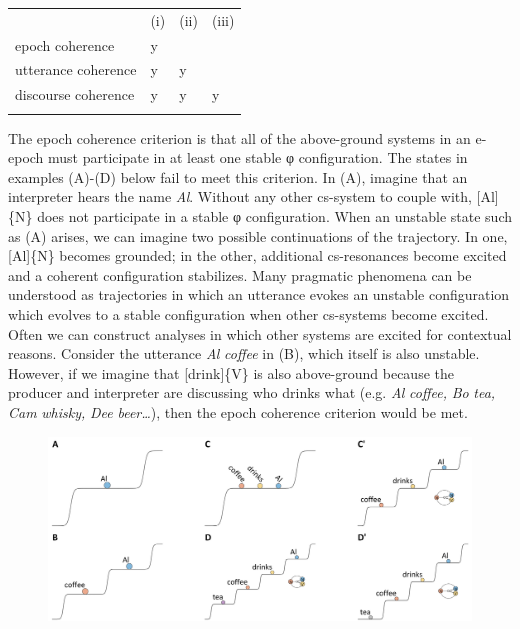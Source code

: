 \begin{tabularx}{\textwidth}{XXXX} & (i) & (ii) & (iii)\\
\lsptoprule
\raggedleft epoch coherence & y &  & \\
\raggedleft utterance coherence & y & y & \\
\raggedleft discourse coherence & y & y & y\\
\lspbottomrule
\end{tabularx}
  The epoch coherence criterion is that all of the above-ground systems in an e-epoch must participate in at least one stable φ configuration. The states in examples (A)-(D) below fail to meet this criterion. In (A), imagine that an interpreter hears the name \textit{Al}. Without any other cs-system to couple with, [Al]\{N\} does not participate in a stable φ configuration. When an unstable state such as (A) arises, we can imagine two possible continuations of the trajectory. In one, [Al]\{N\} becomes grounded; in the other, additional cs-resonances become excited and a coherent configuration stabilizes. Many pragmatic phenomena can be understood as trajectories in which an utterance evokes an unstable configuration which evolves to a stable configuration when other cs-systems become excited. Often we can construct analyses in which other systems are excited for contextual reasons. Consider the utterance \textit{Al} \textit{coffee} in (B), which itself is also unstable. However, if we imagine that [drink]\{V\} is also above-ground because the producer and interpreter are discussing who drinks what (e.g. \textit{Al} \textit{coffee,} \textit{Bo} \textit{tea,} \textit{Cam} \textit{whisky,} \textit{Dee} \textit{beer…}), then the epoch coherence criterion would be met.

  
\begin{figure}
\includegraphics[width=\textwidth]{figures/Tilsen-img124.png}
\caption{\missingcaption}
\label{fig:}
\end{figure}
 

